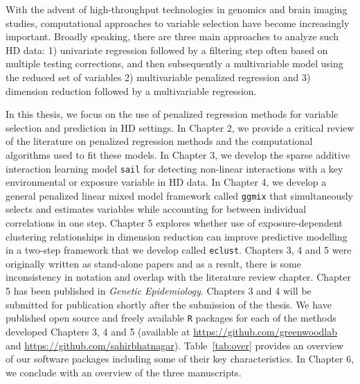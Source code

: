 With the advent of high-throughput technologies in genomics and brain imaging studies, computational approaches to variable selection have become increasingly important. Broadly speaking, there are three main approaches to analyze such HD data: 1) univariate regression followed by a filtering step often based on multiple testing corrections, and then subsequently a multivariable model using the reduced set of variables 2) multivariable penalized regression and 3) dimension reduction followed by a multivariable regression. 

In this thesis, we focus on the use of penalized regression methods for variable selection and prediction in HD settings. 
In Chapter 2, we provide a critical review of the literature on penalized regression methods and the computational algorithms used to fit these models. 
In Chapter 3, we develop the sparse additive interaction learning model \texttt{sail} for detecting non-linear interactions with a key environmental or exposure variable in HD data. 
In Chapter 4, we develop a general penalized linear mixed model framework called \texttt{ggmix} that simultaneously selects and estimates variables while accounting for between individual correlations in one step. 
Chapter 5 explores whether use of exposure-dependent clustering relationships in dimension reduction can improve predictive modelling in a two-step framework that we develop called \texttt{eclust}. 
Chapters 3, 4 and 5 were originally written as stand-alone papers and as a result, there is some inconsistency in notation and overlap with the literature review chapter. Chapter 5 has been published in \textit{Genetic Epidemiology}. 
Chapters 3 and 4 will be submitted for publication shortly after the submission of the thesis. 
We have published open source and freely available \texttt{R} packages for each of the methods developed Chapters 3, 4 and 5 (available at \url{https://github.com/greenwoodlab} and \url{https://github.com/sahirbhatnagar}). 
Table~\ref{tab:over} provides an overview of our software packages including some of their key characteristics. 
In Chapter 6, we conclude with an overview of the three manuscripts.  


